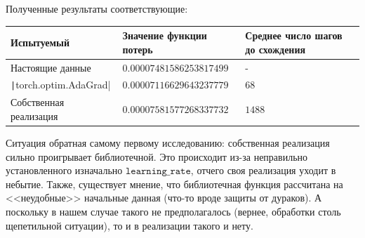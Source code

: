\documentclass[12pt, a4paper, oneside, final]{article}
\begin{document}
	Полученные результаты соответствующие:
	\begin{table}[H]
		\centering
		\begin{tabular}{l|l|l}
			Испытуемый & Значение функции потерь & Среднее число шагов до схождения \\ \hline
			Настоящие данные & $0.00007481586253817499$ & - \\
			\texttt|torch.optim.AdaGrad| & $0.00007116629643237779$ & $68$ \\
			Собственная реализация & $0.00007581577268337732$ & $1488$
		\end{tabular}
	\end{table}
	Ситуация обратная самому первому исследованию: собственная реализация сильно проигрывает библиотечной.
	Это происходит из-за неправильно установленного изначально $\texttt{learning\_rate}$, отчего своя реализация уходит в небытие.
	Также, существует мнение, что библиотечная функция рассчитана на <<неудобные>> начальные данная (что-то вроде защиты от дураков).
	А поскольку в нашем случае такого не предполагалось (вернее, обработки столь щепетильной ситуации), то и в реализации такого и нету.
\end{document}

